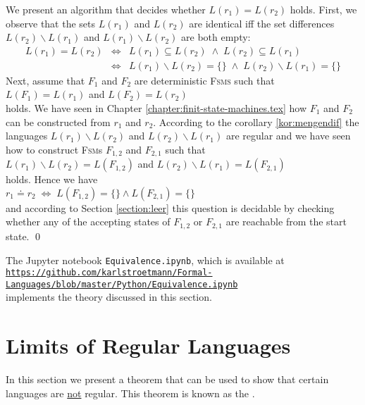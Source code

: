 \proofEng
We present an algorithm that decides whether $L(r_1) = L(r_2)$ holds.  First, we observe that the sets
$L(r_1)$ and $L(r_2)$ are identical iff the set differences $L(r_2) \backslash L(r_1)$ and $L(r_1) \backslash L(r_2)$
are both empty:
\begin{eqnarray*}
                  L(r_1) = L(r_2) 
&\Leftrightarrow& L(r_1) \subseteq L(r_2)         \;\wedge\; L(r_2) \subseteq L(r_1)          \\
&\Leftrightarrow& L(r_1) \backslash L(r_2) = \{\} \;\wedge\; L(r_2) \backslash L(r_1) = \{\}  
\end{eqnarray*}
Next, assume that $F_1$ and $F_2$ are deterministic \textsc{Fsms} such that
\\[0.2cm]
\hspace*{1.3cm}
$L(F_1) = L(r_1)$ \quad and \quad $L(F_2) = L(r_2)$
\\[0.2cm]
holds.  We have seen in Chapter \ref{chapter:finit-state-machines.tex} how $F_1$ and $F_2$ can be
constructed from $r_1$ and $r_2$. According to the corollary \ref{kor:mengendif} the languages
$L(r_1) \backslash L(r_2)$ and $L(r_2) \backslash L(r_1)$ are regular and we have seen how to
construct \textsc{Fsm}s $F_{1,2}$ and $F_{2,1}$ such that
\\[0.2cm]
\hspace*{1.3cm}
$L(r_1) \backslash L(r_2) = L(F_{1,2})$ \quad and \quad $L(r_2) \backslash L(r_1) = L(F_{2,1})$ 
\\[0.2cm]
holds.  Hence we have
\\[0.2cm]
\hspace*{1.3cm}
$r_1 \doteq r_2 \;\Leftrightarrow\; L(F_{1,2}) = \{\} \wedge  L(F_{2,1}) = \{\}$
\\[0.2cm]
and according to Section \ref{section:leer} this question is decidable by checking whether any of
the accepting states of $F_{1,2}$ or $F_{2,1}$ are reachable from the start state.
\qed

\remarkEng
The Jupyter notebook \texttt{Equivalence.ipynb}, which is available at
\\[0.2cm]
\hspace*{0.8cm}
\href{https://github.com/karlstroetmann/Formal-Languages/blob/master/Python/Equivalence.ipynb}{\texttt{https://github.com/karlstroetmann/Formal-Languages/blob/master/Python/Equivalence.ipynb}}
\\[0.2cm]
implements the theory discussed in this section.

\section{Limits of Regular Languages}
In this section we present a theorem that can be used to show that certain languages are
\underline{not} regular.  This theorem is known as the 
\href{https://en.wikipedia.org/wiki/Pumping_lemma_for_regular_languages}{}.

